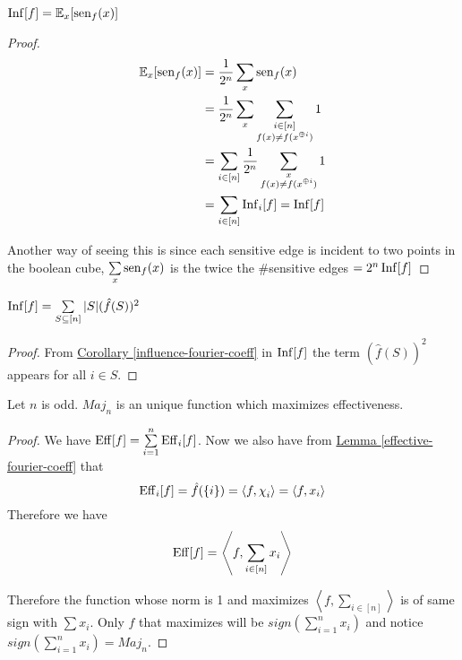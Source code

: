 \begin{lemma}
	$\operatorname{Inf}[f]=\mathbb{E}_{x}[\operatorname{sen}_f(x)]$
\end{lemma}
\begin{proof}
	\begin{align*}
		\mathbb{E}_x[\operatorname{sen}_f(x)] & = \frac1{2^n}\sum\limits_x\operatorname{sen}_f(x)\\
		& = \frac1{2^n}\sum\limits_{x}\sum\limits_{\substack{i\in [n]\\ f(x)\neq f(x^{\oplus i})}}1\\
		&= \sum\limits_{i\in[n]}\frac1{2^n}\sum_{\substack{x\\ f(x)\neq f(x^{\oplus i})}}1\\
		& = \sum_{i\in[n]}\operatorname{Inf}_i[f]=\operatorname{Inf}[f]
	\end{align*}

Another way of seeing this is since each sensitive edge is incident to two points in the boolean cube, $\sum\limits_x \operatorname{sen}_f(x)$ is the twice the $\#$sensitive edges $=2^n\operatorname{Inf}[f]$
\end{proof}
\begin{lemma}
	$\operatorname{Inf}[f]=\sum\limits_{S\subseteq [n]}|S|(\hat{f}(S))^2$
\end{lemma}
\begin{proof}
	From \hyperref[influence-fourier-coeff]{Corollary \ref{influence-fourier-coeff}} in $\operatorname{Inf}[f]$ the term $(\hat{f}(S))^2 $ appears for all $i\in S$. 
\end{proof}
\begin{theorem}
	Let $n$ is odd. $Maj_n$ is an unique function which maximizes effectiveness.
\end{theorem}
\begin{proof}
	We have $\operatorname{Eff}[f]=\sum\limits_{i=1}^n \operatorname{Eff}_i[f]$. Now we also have from  \hyperref[effective-fourier-coeff]{Lemma \ref{effective-fourier-coeff}} that $$\eff_i[f]=\hat{f}(\{i\})=\langle f,\chi_i\rangle=\langle f,x_i\rangle$$Therefore we have $$\operatorname{Eff}[f]=\left\langle f,\sum_{i\in[n]} x_i\right\rangle$$
	\setlength{\parindent}{1cm}
	
	Therefore the function whose norm is 1 and maximizes $\left\langle f,\sum\limits_{i\in [n]}\right\rangle$ is of same sign with $\sum x_i$. Only $f$ that maximizes will be $sign \left(  \sum\limits_{i=1}^n x_i  \right)$ and notice $sign \left( \sum\limits_{i=1}^n x_i\right)=Maj_n$.
\end{proof}